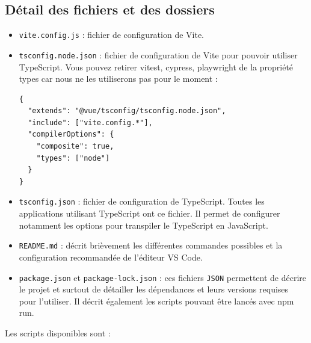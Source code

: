 \subsection{Détail des fichiers et des dossiers}
\begin{itemize}
\item {\tt vite.config.js} : fichier de configuration de Vite.
\item {\tt tsconfig.node.json} : fichier de configuration de Vite pour pouvoir utiliser TypeScript. Vous pouvez retirer vitest, cypress, playwright de la propriété types car nous ne les utiliserons pas pour le moment :


\begin{verbatim}
{
  "extends": "@vue/tsconfig/tsconfig.node.json",
  "include": ["vite.config.*"],
  "compilerOptions": {
    "composite": true,
    "types": ["node"]
  }
}
\end{verbatim} 
\item {\tt tsconfig.json} : fichier de configuration de TypeScript. Toutes les applications utilisant TypeScript ont ce fichier. Il permet de configurer notamment les options pour transpiler le TypeScript en JavaScript.
\item {\tt README.md} : décrit brièvement les différentes commandes possibles et la configuration recommandée de l'éditeur VS Code.
\item {\tt package.json} et {\tt package-lock.json} : ces fichiers {\tt JSON} permettent de décrire le projet et surtout de détailler les dépendances et leurs versions requises pour l'utiliser. Il décrit également les scripts pouvant être lancés avec {\color{monOrange}npm run}.
\end{itemize}
Les scripts disponibles sont :

